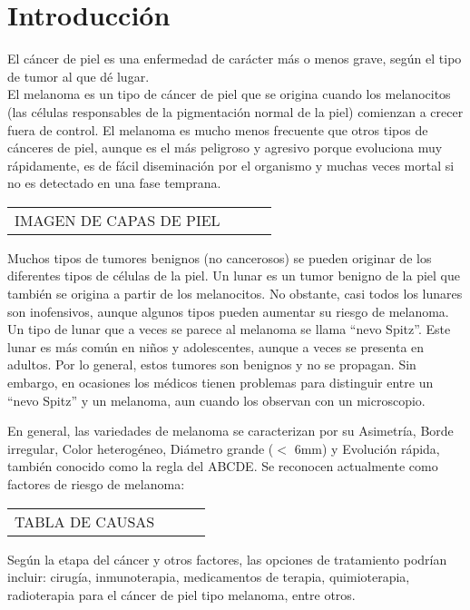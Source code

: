 \section{Introducción}
El cáncer de piel es una enfermedad de carácter más o menos grave, según el tipo de tumor al que dé lugar. \\
El melanoma es un tipo de cáncer de piel que se origina cuando los melanocitos (las células responsables de la pigmentación normal de la piel) comienzan a crecer fuera de control. El melanoma es mucho menos frecuente que otros tipos de cánceres de piel, aunque es el más peligroso y agresivo porque evoluciona muy rápidamente, es de fácil diseminación por el organismo y muchas veces mortal si no es detectado en una fase temprana. 
\bigskip

\begin{tabular}{|cl|cl|}
IMAGEN DE CAPAS DE PIEL 
\end{tabular}

\pagestyle{fancy}
\fancyhf{}
\newpage
Muchos tipos de tumores benignos (no cancerosos) se pueden originar de los diferentes tipos de células de la piel. Un lunar es un tumor benigno de la piel que también se origina a partir de los melanocitos. No obstante, casi todos los lunares son inofensivos, aunque algunos tipos pueden aumentar su riesgo de melanoma. \\
Un tipo de lunar que a veces se parece al melanoma se llama “nevo Spitz”. Este lunar es más común en niños y adolescentes, aunque a veces se presenta en adultos. Por lo general, estos tumores son benignos y no se propagan. Sin embargo, en ocasiones los médicos tienen problemas para distinguir entre un “nevo Spitz” y un melanoma, aun cuando los observan con un microscopio.

En general, las variedades de melanoma se caracterizan por su Asimetría, Borde irregular, Color heterogéneo, Diámetro grande ($<$ 6mm) y Evolución rápida, también conocido como la regla del ABCDE.
Se reconocen actualmente como factores de riesgo de melanoma: 
\bigskip

\begin{tabular}{|cl|cl|}
TABLA DE CAUSAS
\end{tabular}

\bigskip
Según la etapa del cáncer y otros factores, las opciones de tratamiento podrían incluir: cirugía, inmunoterapia, medicamentos de terapia, quimioterapia, radioterapia para el cáncer de piel tipo melanoma, entre otros.
